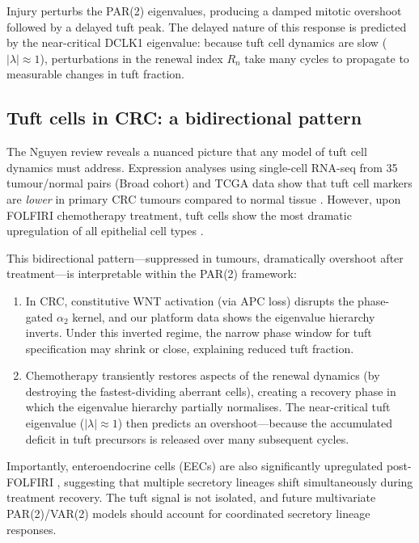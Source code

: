 \documentclass[11pt,letterpaper]{article}
\theoremstyle{definition}
\theoremstyle{remark}
\begin{document}
Injury perturbs the PAR(2) eigenvalues, producing a damped mitotic overshoot followed by a delayed tuft peak. The delayed nature of this response is predicted by the near-critical DCLK1 eigenvalue: because tuft cell dynamics are slow ($|\lambda| \approx 1$), perturbations in the renewal index $R_n$ take many cycles to propagate to measurable changes in tuft fraction.

\subsection{Tuft cells in CRC: a bidirectional pattern}
\label{sec:tuft_crc}

The Nguyen review \citep{nguyen2025colonic} reveals a nuanced picture that any model of tuft cell dynamics must address. Expression analyses using single-cell RNA-seq from 35 tumour/normal pairs (Broad cohort) and TCGA data show that tuft cell markers are \textit{lower} in primary CRC tumours compared to normal tissue \citep{nguyen2025colonic}. However, upon FOLFIRI chemotherapy treatment, tuft cells show the most dramatic upregulation of all epithelial cell types \citep{mzoughi2025chemotherapy}.

This bidirectional pattern---suppressed in tumours, dramatically overshoot after treatment---is interpretable within the PAR(2) framework:
\begin{enumerate}
\item In CRC, constitutive WNT activation (via APC loss) disrupts the phase-gated $\alpha_2$ kernel, and our platform data shows the eigenvalue hierarchy inverts. Under this inverted regime, the narrow phase window for tuft specification may shrink or close, explaining reduced tuft fraction.
\item Chemotherapy transiently restores aspects of the renewal dynamics (by destroying the fastest-dividing aberrant cells), creating a recovery phase in which the eigenvalue hierarchy partially normalises. The near-critical tuft eigenvalue ($|\lambda| \approx 1$) then predicts an overshoot---because the accumulated deficit in tuft precursors is released over many subsequent cycles.
\end{enumerate}

Importantly, enteroendocrine cells (EECs) are also significantly upregulated post-FOLFIRI \citep{nguyen2025colonic, mzoughi2025chemotherapy}, suggesting that multiple secretory lineages shift simultaneously during treatment recovery. The tuft signal is not isolated, and future multivariate PAR(2)/VAR(2) models should account for coordinated secretory lineage responses.
\end{document}
